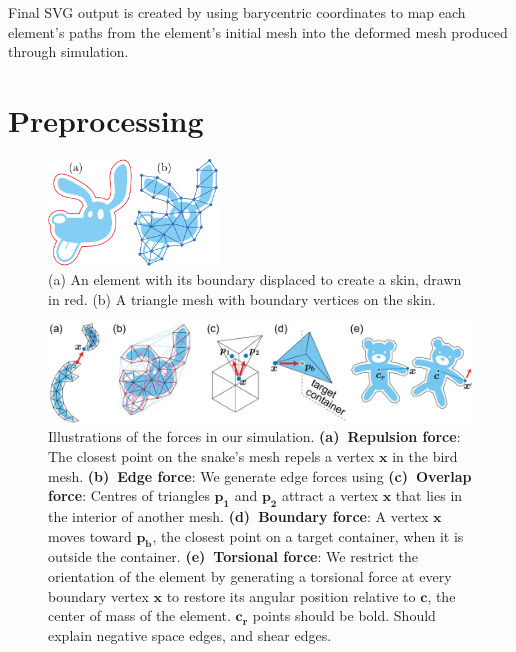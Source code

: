 Final SVG output is created by using barycentric coordinates to map each element's
paths from the element's initial mesh into the deformed mesh produced through
simulation.


\section{Preprocessing}
\label{repulsionpak_preprocessing}

\begin{figure}[t] %
\centering
\includegraphics[width=4.5cm]{figures/repulsionpak/element_skin_triangles_2.pdf}
\caption[Element discretization]{
	\label{fig_elements_image}
	(a) An element with its boundary displaced to create a skin, drawn in red.
	(b) A triangle mesh with boundary vertices on the skin.
}
\end{figure}

\begin{figure}[t]
\centering
\includegraphics[width=1.0\textwidth]{figures/repulsionpak/all_forces_new.pdf}
\caption[Forces]{
\label{fig_forces}
Illustrations of the forces in our simulation.
\;\textbf{(a)~Repulsion force}:
The closest point on the snake's mesh
repels a vertex $\bm{x}$ in the bird mesh.
\textbf{(b)~Edge force}: 
We generate edge forces using
\textbf{(c)~Overlap force}: 
Centres of triangles $\bm{p_1}$ and $\bm{p_2}$ attract a vertex
$\bm{x}$ that lies in the interior of another mesh.
\;\textbf{(d)~Boundary force}: A vertex $\bm{x}$ moves toward $\bm{p_b}$,
the closest point on a target container, when it is outside the container.
\textbf{(e)~Torsional force}: We restrict the orientation of the element by generating 
a torsional force at every boundary vertex $\bm{x}$
to restore its angular position relative to $\bm{c}$, 
the center of mass of the element.
\mynote
{
$\bm{c_r}$
points should be bold.
Should explain negative space edges, and shear edges.
}
}
\end{figure}


